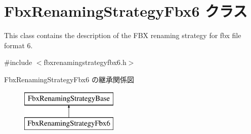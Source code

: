 \hypertarget{class_fbx_renaming_strategy_fbx6}{}\section{Fbx\+Renaming\+Strategy\+Fbx6 クラス}
\label{class_fbx_renaming_strategy_fbx6}


This class contains the description of the F\+BX renaming strategy for fbx file format 6.  




{\ttfamily \#include $<$fbxrenamingstrategyfbx6.\+h$>$}

Fbx\+Renaming\+Strategy\+Fbx6 の継承関係図\begin{figure}[H]
\begin{center}
\leavevmode
\includegraphics[height=2.000000cm]{class_fbx_renaming_strategy_fbx6}
\end{center}
\end{figure}
